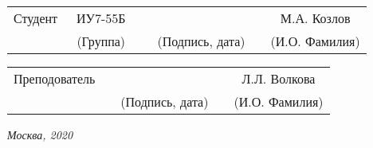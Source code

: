 \vspace{1.5cm}
\noindent
\begin{tabular}{l c c c c c}
    Студент      & ~ИУ7-55Б~               & \hspace{3.5cm} & \hspace{3.5cm}                 & &  М.А. Козлов \\\cline{2-2}\cline{4-4} \cline{6-6} 
    \hspace{3cm} & {\footnotesize(Группа)} &                & {\footnotesize(Подпись, дата)} & & {\footnotesize(И.О. Фамилия)}
\end{tabular}

\vspace{1cm}

\noindent
\begin{tabular}{l c c c c}
    Преподователь & \hspace{6cm}   & \hspace{3.5cm}                 & & Л.Л. Волкова \\\cline{3-3} \cline{5-5} 
    \hspace{3cm}  &                & {\footnotesize(Подпись, дата)} & & {\footnotesize(И.О. Фамилия)}
\end{tabular}

\begin{center}	
	\vfill
	\large \textit {Москва, 2020}
\end{center}

\thispagestyle {empty}
\pagebreak